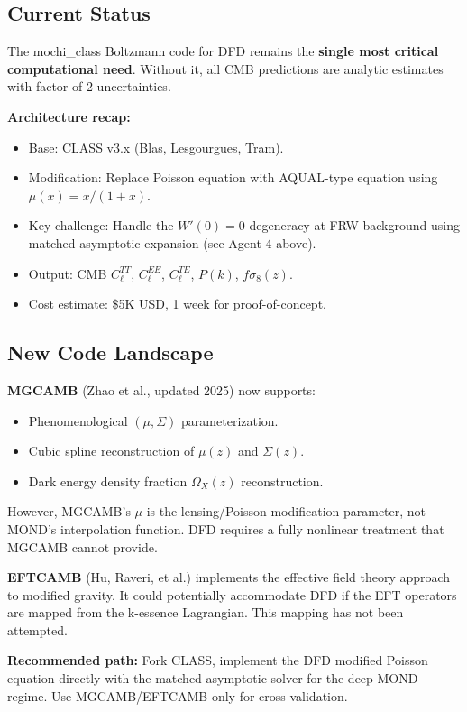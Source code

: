 \documentclass[11pt]{article}
\begin{document}
\subsection{Current Status}

The mochi\_class Boltzmann code for DFD remains the \textbf{single most
critical computational need}. Without it, all CMB predictions are
analytic estimates with factor-of-2 uncertainties.

\textbf{Architecture recap:}
\begin{itemize}
  \item Base: CLASS v3.x (Blas, Lesgourgues, Tram).
  \item Modification: Replace Poisson equation with AQUAL-type equation
    using $\mu(x) = x/(1+x)$.
  \item Key challenge: Handle the $W'(0) = 0$ degeneracy at FRW background
    using matched asymptotic expansion (see Agent 4 above).
  \item Output: CMB $C_\ell^{TT}$, $C_\ell^{EE}$, $C_\ell^{TE}$, $P(k)$,
    $f\sigma_8(z)$.
  \item Cost estimate: \$5K USD, 1 week for proof-of-concept.
\end{itemize}

\subsection{New Code Landscape}

\textbf{MGCAMB} (Zhao et al., updated 2025) now supports:
\begin{itemize}
  \item Phenomenological $(\mu, \Sigma)$ parameterization.
  \item Cubic spline reconstruction of $\mu(z)$ and $\Sigma(z)$.
  \item Dark energy density fraction $\Omega_X(z)$ reconstruction.
\end{itemize}
However, MGCAMB's $\mu$ is the lensing/Poisson modification parameter,
not MOND's interpolation function. DFD requires a fully nonlinear
treatment that MGCAMB cannot provide.

\textbf{EFTCAMB} (Hu, Raveri, et al.) implements the effective field
theory approach to modified gravity. It could potentially accommodate
DFD if the EFT operators are mapped from the k-essence Lagrangian.
This mapping has not been attempted.

\textbf{Recommended path:} Fork CLASS, implement the DFD modified
Poisson equation directly with the matched asymptotic solver for the
deep-MOND regime. Use MGCAMB/EFTCAMB only for cross-validation.
\end{document}
